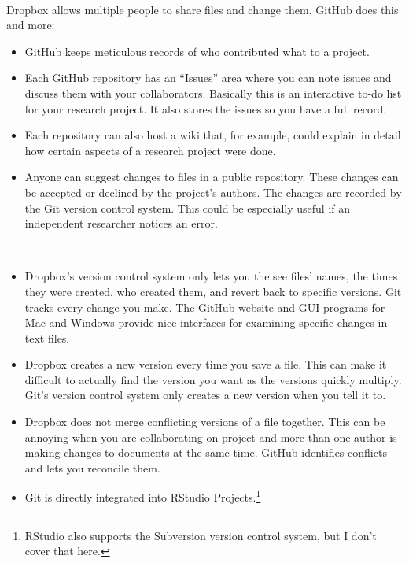        
 \\[0.25cm]

Dropbox allows multiple people to share files and change them. GitHub does this and more:

\begin{itemize}
        \item GitHub keeps meticulous records of who contributed what to a project.
        \item Each GitHub repository has an ``Issues'' area where you can note issues and discuss them with your collaborators. Basically this is an interactive to-do list for your research project. It also stores the issues so you have a full record.
        \item Each repository can also host a wiki that, for example, could explain in detail how certain aspects of a research project were done.
        \item Anyone can suggest changes to files in a public repository. These changes can be accepted or declined by the project's authors. The changes are recorded by the Git version control system. This could be especially useful if an independent researcher notices an error. 
\end{itemize}\\[0.25cm]

\begin{itemize}
\item
  Dropbox's version control system only lets you the see files' names, the times they were created, who created them, and revert back to specific versions. Git tracks every change you make. The GitHub website and GUI programs for Mac and Windows provide nice interfaces for examining specific changes in text files.
\item
  Dropbox creates a new version every time you save a file. This can make it difficult to actually find the version you want as the versions quickly multiply. Git's version control system only creates a new version when you tell it to.
\item
  Dropbox does not merge conflicting versions of a file together. This can be annoying when you are collaborating on project and more than one author is making changes to documents at the same time. GitHub identifies conflicts and lets you reconcile them.
\item
  Git is directly integrated into RStudio Projects.\footnote{RStudio also supports the Subversion version
  control system, but I don't cover that here.}
\end{itemize}

